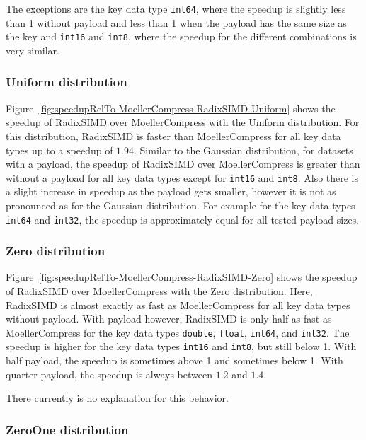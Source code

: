 \documentclass[12pt, a4paper, openright, twoside]{tiarbeit}
\begin{document}
The exceptions are the key data type
\texttt{int64}, where the speedup is slightly less than
1 without payload and less than 1 when the payload has the same size as the key
and \texttt{int16} and \texttt{int8}, where the speedup for the
different combinations is very similar.

\subsubsection*{Uniform distribution}


Figure~\ref{fig:speedupRelTo-MoellerCompress-RadixSIMD-Uniform} shows the speedup of RadixSIMD
over MoellerCompress with the Uniform distribution. For this distribution,
RadixSIMD is faster than MoellerCompress for all key data types up to a
speedup of $1.94$.
Similar to the Gaussian distribution, for datasets with a payload, the
speedup of RadixSIMD over MoellerCompress is greater than without a payload
for all key data types except for \texttt{int16} and \texttt{int8}.
Also there is a slight increase in speedup as the payload gets smaller, however
it is not as pronounced as for the Gaussian distribution. For example for the
key data types \texttt{int64} and \texttt{int32}, the speedup is approximately
equal for all tested payload sizes.

\subsubsection*{Zero distribution}


Figure~\ref{fig:speedupRelTo-MoellerCompress-RadixSIMD-Zero} shows the speedup of RadixSIMD
over MoellerCompress with the Zero distribution. Here, RadixSIMD is almost
exactly as fast as MoellerCompress for all key data types without payload.
With payload however, RadixSIMD is only half as fast as MoellerCompress
for the key data types \texttt{double}, \texttt{float}, \texttt{int64},
and \texttt{int32}. The speedup is higher for the key data types \texttt{int16}
and \texttt{int8}, but still below 1.
With half payload, the speedup is sometimes above 1 and sometimes below 1.
With quarter payload, the speedup is always between $1.2$ and $1.4$.

There currently is no explanation for this behavior.

\subsubsection*{ZeroOne distribution}
\end{document}
